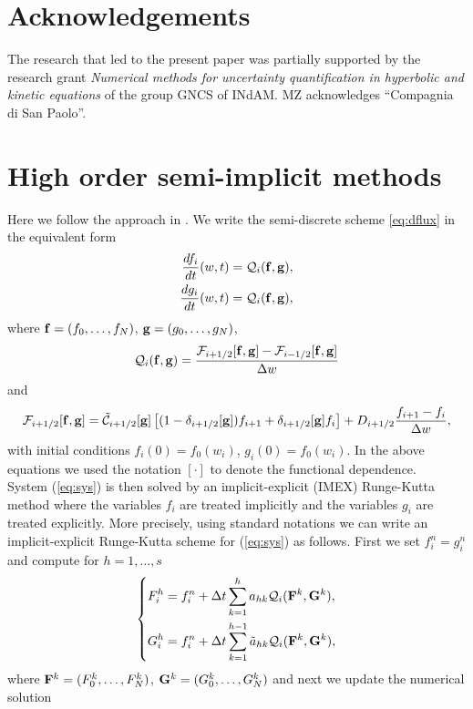 \documentclass[a4paper]{article}
\theoremstyle{remark}\newtheorem{remark}{Remark}
\newcommand{\F}{\mathcal{F}}
\newcommand{\C}{\mathcal{C}}
\newcommand{\be}{\begin{equation}}
\newcommand{\ee}{\end{equation}}
\begin{document}
\section*{Acknowledgements}
The research that led to the present paper was partially supported by the research grant {\it Numerical methods for uncertainty quantification in hyperbolic and kinetic equations} 
of the group GNCS of INdAM. MZ acknowledges ``Compagnia di San Paolo''. 

\appendix

\section{High order semi-implicit methods}\label{appendix:A}
Here we follow the approach in \cite{BFR}. We write the semi-discrete scheme \eqref{eq:dflux} in the equivalent form 
\be\label{eq:sys}
\begin{split}
\frac{df_i}{dt}(w,t) &= {\mathcal Q}_i({\bf f},{\bf g}),\\
\frac{dg_i}{dt}(w,t) &= {\mathcal Q}_i({\bf f},{\bf g}),\\
\end{split}
\ee
where ${\bf f}=(f_0,\ldots,f_N)$, ${\bf g}=(g_0,\ldots,g_N)$, 
\be
{\mathcal Q}_i({\bf f},{\bf g}) = \frac{{\F}_{i+1/2}[{\bf f},{\bf g}]-{\F}_{i-1/2}[{\bf f},{\bf g}]}{\Delta w}
\ee
and
\be
{\F}_{i+1/2}[{\bf f},{\bf g}]= \tilde{\C}_{i+1/2}[{\bf g}] \left[ (1-\delta_{i+1/2}[{\bf g}])f_{i+1}+\delta_{i+1/2}[{\bf g}] f_i \right]+D_{i+1/2}\dfrac{f_{i+1}-f_i}{\Delta w},
\ee
with initial conditions $f_i(0)=f_0(w_i)$, $g_i(0)=f_0(w_i)$. In the above equations we used the notation $[\cdot]$ to denote the functional dependence.\\
System (\ref{eq:sys}) is then solved by an implicit-explicit (IMEX) Runge-Kutta method \cite{PR} where the variables ${f}_i$ are treated implicitly and the variables ${g}_i$ are treated explicitly. 
More precisely, using standard notations we can write an implicit-explicit Runge-Kutta scheme for (\ref{eq:sys}) as follows. First we set $f_i^n=g_i^n$ and compute for $h=1,\ldots,s$
\be
\left\lbrace
\begin{split}
F_i^h&=f_i^n+\Delta t \sum_{k=1}^{h} a_{hk} {\mathcal Q}_i({\bf F}^k,{\bf G}^k) ,\\
G_i^h&=f_i^n+\Delta t \sum_{k=1}^{h-1} {\tilde a}_{hk} {\mathcal Q}_i({\bf F}^k,{\bf G}^k),
\end{split}
\right.
\ee
where ${\bf F}^k = (F_0^k,\ldots,F_N^k)$, ${\bf G}^k = (G_0^k,\ldots,G_N^k)$  and next we update the numerical solution 
\end{document}
